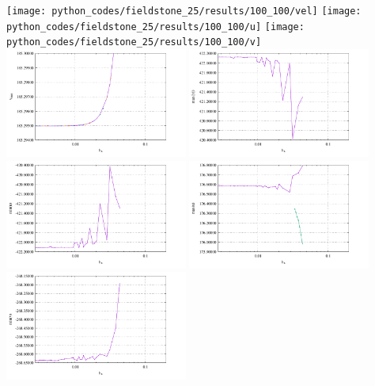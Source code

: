 \begin{center}
\texttt{[image: python\_codes/fieldstone\_25/results/100\_100/vel]}
\texttt{[image: python\_codes/fieldstone\_25/results/100\_100/u]}
\texttt{[image: python\_codes/fieldstone\_25/results/100\_100/v]}\\
\includegraphics[width=6cm]{python_codes/fieldstone_25/results/vrms_100.pdf}
\includegraphics[width=6cm]{python_codes/fieldstone_25/results/max_vel_100.pdf}\\
\includegraphics[width=6cm]{python_codes/fieldstone_25/results/min_u_100.pdf}
\includegraphics[width=6cm]{python_codes/fieldstone_25/results/max_u_100.pdf}\\
\includegraphics[width=6cm]{python_codes/fieldstone_25/results/min_v_100.pdf}

\end{center}

